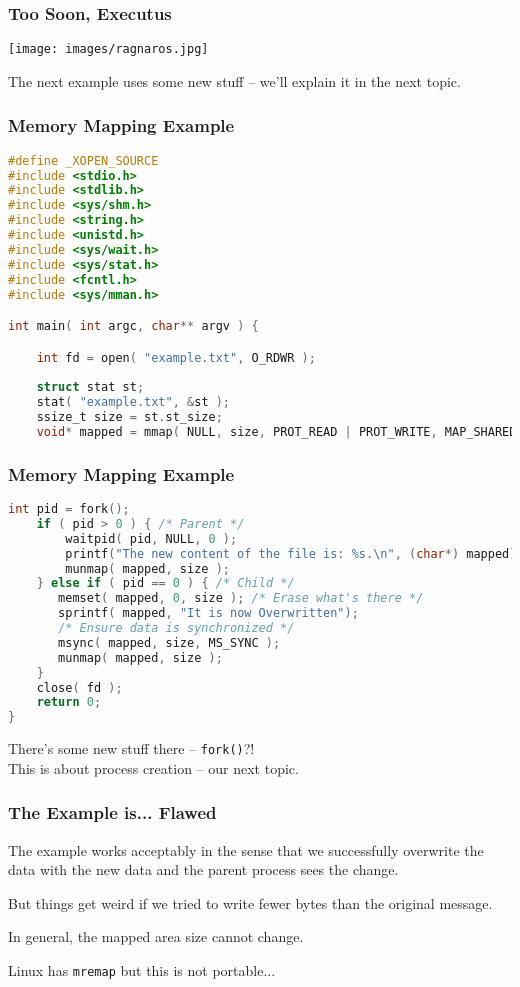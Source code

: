 \begin{frame}
\frametitle{Too Soon, Executus}

\begin{center}
  \texttt{[image: images/ragnaros.jpg]}
\end{center}

The next example uses some new stuff -- we'll explain it in the next topic.

\end{frame}


\begin{frame}[fragile]
	\frametitle{Memory Mapping Example}

	\begin{lstlisting}[language=C]
#define _XOPEN_SOURCE
#include <stdio.h>
#include <stdlib.h>
#include <sys/shm.h>
#include <string.h>
#include <unistd.h>
#include <sys/wait.h>
#include <sys/stat.h>
#include <fcntl.h>
#include <sys/mman.h>

int main( int argc, char** argv ) { 

    int fd = open( "example.txt", O_RDWR );
    
    struct stat st; 
    stat( "example.txt", &st );
    ssize_t size = st.st_size;
    void* mapped = mmap( NULL, size, PROT_READ | PROT_WRITE, MAP_SHARED, fd, 0 );  
\end{lstlisting}
\end{frame}

\begin{frame}[fragile]
	\frametitle{Memory Mapping Example}

	\begin{lstlisting}[language=C]
    int pid = fork();
    if ( pid > 0 ) { /* Parent */
        waitpid( pid, NULL, 0 );
        printf("The new content of the file is: %s.\n", (char*) mapped);
        munmap( mapped, size );
    } else if ( pid == 0 ) { /* Child */
       memset( mapped, 0, size ); /* Erase what's there */
       sprintf( mapped, "It is now Overwritten");
       /* Ensure data is synchronized */
       msync( mapped, size, MS_SYNC );
       munmap( mapped, size );
    }
    close( fd );
    return 0;
}
\end{lstlisting}

There's some new stuff there -- \texttt{fork()}?!\\
\quad This is about process creation -- our next topic.

\end{frame}

\begin{frame}
	\frametitle{The Example is... Flawed}

	The example works acceptably in the sense that we successfully overwrite the data with the new data and the parent process sees the change.

	But things get weird if we tried to write fewer bytes than the original message.

	In general, the mapped area size cannot change.

	Linux has \texttt{mremap} but this is not portable...

\end{frame}

